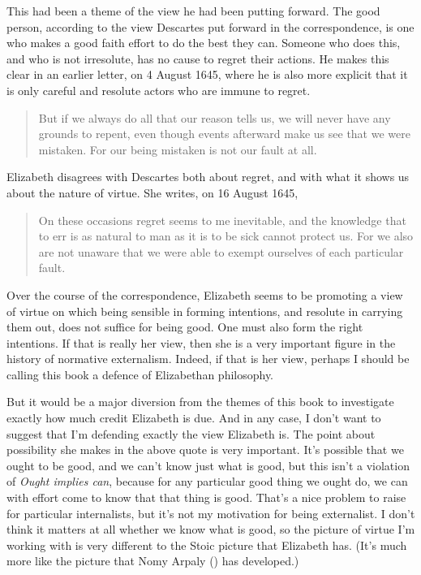 \documentclass[
  10pt,
  letterpaper,
  twoside]{scrbook}
\begin{document}
This had been a theme of the view he had been putting forward. The good
person, according to the view Descartes put forward in the
correspondence, is one who makes a good faith effort to do the best they
can. Someone who does this, and who is not irresolute, has no cause to
regret their actions. He makes this clear in an earlier letter, on 4
August 1645, where he is also more explicit that it is only careful and
resolute actors who are immune to regret.

\begin{quote}
But if we always do all that our reason tells us, we will never have any
grounds to repent, even though events afterward make us see that we were
mistaken. For our being mistaken is not our fault at all.
\end{quote}

Elizabeth disagrees with Descartes both about regret, and with what it
shows us about the nature of virtue. She writes, on 16 August 1645,

\begin{quote}
On these occasions regret seems to me inevitable, and the knowledge that
to err is as natural to man as it is to be sick cannot protect us. For
we also are not unaware that we were able to exempt ourselves of each
particular fault.
\end{quote}

Over the course of the correspondence, Elizabeth seems to be promoting a
view of virtue on which being sensible in forming intentions, and
resolute in carrying them out, does not suffice for being good. One must
also form the right intentions. If that is really her view, then she is
a very important figure in the history of normative externalism. Indeed,
if that is her view, perhaps I should be calling this book a defence of
Elizabethan philosophy.

But it would be a major diversion from the themes of this book to
investigate exactly how much credit Elizabeth is due. And in any case, I
don't want to suggest that I'm defending exactly the view Elizabeth is.
The point about possibility she makes in the above quote is very
important. It's possible that we ought to be good, and we can't know
just what is good, but this isn't a violation of \emph{Ought implies
can}, because for any particular good thing we ought do, we can with
effort come to know that that thing is good. That's a nice problem to
raise for particular internalists, but it's not my motivation for being
externalist. I don't think it matters at all whether we know what is
good, so the picture of virtue I'm working with is very different to the
Stoic picture that Elizabeth has. (It's much more like the picture that
Nomy Arpaly () has developed.)
\end{document}
